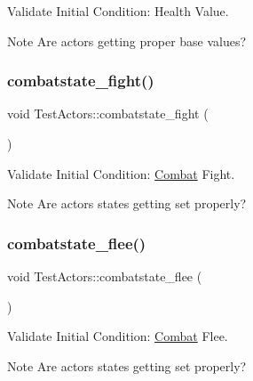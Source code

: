 Validate Initial Condition\+: Health Value. 

\begin{DoxyNote}{Note}
Are actors getting proper base values? 
\end{DoxyNote}
\mbox{\label{classTestActors_a86cb8f2392e36427cf5dfd7d6313105b}} 
\subsubsection{\texorpdfstring{combatstate\+\_\+fight()}{combatstate\_fight()}}
{\footnotesize\ttfamily void Test\+Actors\+::combatstate\+\_\+fight (\begin{DoxyParamCaption}{ }\end{DoxyParamCaption})}



Validate Initial Condition\+: \mbox{\hyperlink{classCombat}{Combat}} Fight. 

\begin{DoxyNote}{Note}
Are actors states getting set properly? 
\end{DoxyNote}
\mbox{\label{classTestActors_a029ff6f76874eea67642c655fc106fcc}} 
\subsubsection{\texorpdfstring{combatstate\+\_\+flee()}{combatstate\_flee()}}
{\footnotesize\ttfamily void Test\+Actors\+::combatstate\+\_\+flee (\begin{DoxyParamCaption}{ }\end{DoxyParamCaption})}



Validate Initial Condition\+: \mbox{\hyperlink{classCombat}{Combat}} Flee. 

\begin{DoxyNote}{Note}
Are actors states getting set properly? 
\end{DoxyNote}
\mbox{\label{classTestActors_a0c3caa73a8638b6032ec984b44c739a3}} 
